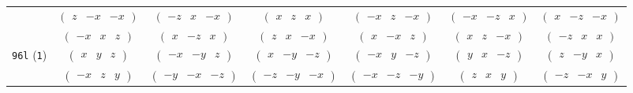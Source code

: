 \documentclass[fleqn,9pt,landscape]{jsarticle}
\begin{document}
\begin{center}
\begin{longtable}{ccccccc}
& $ \begin{pmatrix} z & - x & - x \end{pmatrix} $ & $ \begin{pmatrix} - z & x & - x \end{pmatrix} $ & $ \begin{pmatrix} x & z & x \end{pmatrix} $ & $ \begin{pmatrix} - x & z & - x \end{pmatrix} $ & $ \begin{pmatrix} - x & - z & x \end{pmatrix} $ & $ \begin{pmatrix} x & - z & - x \end{pmatrix} $ \\
& $ \begin{pmatrix} - x & x & z \end{pmatrix} $ & $ \begin{pmatrix} x & - z & x \end{pmatrix} $ & $ \begin{pmatrix} z & x & - x \end{pmatrix} $ & $ \begin{pmatrix} x & - x & z \end{pmatrix} $ & $ \begin{pmatrix} x & z & - x \end{pmatrix} $ & $ \begin{pmatrix} - z & x & x \end{pmatrix} $ \\ \hline
{\tt 96l} ({\tt 1}) & $ \begin{pmatrix} x & y & z \end{pmatrix} $ & $ \begin{pmatrix} - x & - y & z \end{pmatrix} $ & $ \begin{pmatrix} x & - y & - z \end{pmatrix} $ & $ \begin{pmatrix} - x & y & - z \end{pmatrix} $ & $ \begin{pmatrix} y & x & - z \end{pmatrix} $ & $ \begin{pmatrix} z & - y & x \end{pmatrix} $ \\
& $ \begin{pmatrix} - x & z & y \end{pmatrix} $ & $ \begin{pmatrix} - y & - x & - z \end{pmatrix} $ & $ \begin{pmatrix} - z & - y & - x \end{pmatrix} $ & $ \begin{pmatrix} - x & - z & - y \end{pmatrix} $ & $ \begin{pmatrix} z & x & y \end{pmatrix} $ & $ \begin{pmatrix} - z & - x & y \end{pmatrix} $ \\

\end{longtable}
\end{center}
\end{document}

